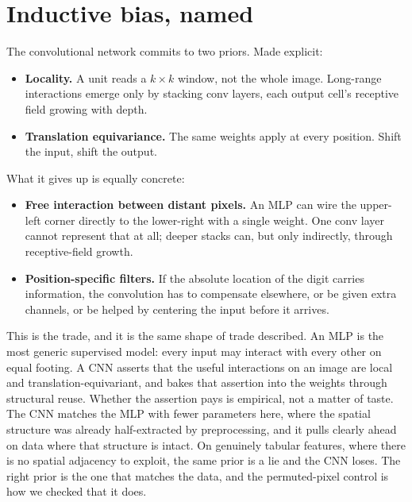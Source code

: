 
\section{Inductive bias, named}\label{sec:cnn-bias}

The convolutional network commits to two priors. Made explicit:
\begin{itemize}
\item \textbf{Locality.} A unit reads a $k \times k$ window, not the whole
  image. Long-range interactions emerge only by stacking conv layers, each
  output cell's receptive field growing with depth.
\item \textbf{Translation equivariance.} The same weights apply at every
  position. Shift the input, shift the output.
\end{itemize}
What it gives up is equally concrete:
\begin{itemize}
\item \textbf{Free interaction between distant pixels.} An MLP can wire the
  upper-left corner directly to the lower-right with a single weight. One conv
  layer cannot represent that at all; deeper stacks can, but only indirectly,
  through receptive-field growth.
\item \textbf{Position-specific filters.} If the absolute location of the
  digit carries information, the convolution has to compensate elsewhere, or
  be given extra channels, or be helped by centering the input before it
  arrives.
\end{itemize}

This is the trade, and it is the same shape of trade 
described. An MLP is the most generic supervised model: every input may
interact with every other on equal footing. A CNN asserts that the useful
interactions on an image are local and translation-equivariant, and bakes that
assertion into the weights through structural reuse. Whether the assertion
pays is empirical, not a matter of taste. The CNN matches the MLP with fewer
parameters here, where the spatial structure was already half-extracted by
preprocessing, and it pulls clearly ahead on data where that structure is
intact. On genuinely tabular features, where there is no spatial adjacency to
exploit, the same prior is a lie and the CNN loses. The right prior is the one
that matches the data, and the permuted-pixel control is how we checked that
it does.

